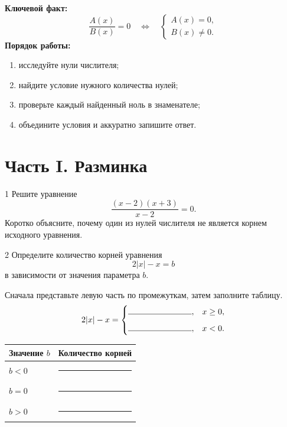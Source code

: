 \studentline

\begin{routebox}
  \textbf{Ключевой факт:}
  \[
    \frac{A(x)}{B(x)}=0
    \quad\Longleftrightarrow\quad
    \begin{cases}
      A(x)=0,\\
      B(x)\ne 0.
    \end{cases}
  \]
  \textbf{Порядок работы:}
  \begin{enumerate}[label=\arabic*.,leftmargin=1.8em,itemsep=0.2em,topsep=0.25em]
    \item исследуйте нули числителя;
    \item найдите условие нужного количества нулей;
    \item проверьте каждый найденный ноль в знаменателе;
    \item объедините условия и аккуратно запишите ответ.
  \end{enumerate}
\end{routebox}

\section*{Часть I. Разминка}

\begin{homeworktask}{1}
  Решите уравнение
  \[
    \frac{(x-2)(x+3)}{x-2}=0.
  \]
  Коротко объясните, почему один из нулей числителя не является корнем
  исходного уравнения.
\end{homeworktask}
\answerspace{14mm}

\begin{homeworktask}{2}
  Определите количество корней уравнения
  \[
    2|x|-x=b
  \]
  в зависимости от значения параметра \(b\).

  Сначала представьте левую часть по промежуткам, затем заполните таблицу.
  \[
    2|x|-x=
    \begin{cases}
      \rule{27mm}{0.4pt}, & x\ge 0,\\[2mm]
      \rule{27mm}{0.4pt}, & x<0.
    \end{cases}
  \]

  \begin{center}
    \renewcommand{\arraystretch}{1.4}
    \begin{tabularx}{0.78\textwidth}{>{\centering\arraybackslash}p{}>{\centering\arraybackslash}X}
      \toprule
      \rowcolor{TableHeader}
      Значение \(b\) & Количество корней \\
      \midrule
      \(b<0\) & \rule{30mm}{0.4pt} \\
      \(b=0\) & \rule{30mm}{0.4pt} \\
      \(b>0\) & \rule{30mm}{0.4pt} \\
      \bottomrule
    \end{tabularx}
  \end{center}
\end{homeworktask}

